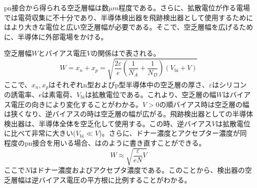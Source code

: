 pn接合から得られる空乏層幅は数$\si{\micro m}$程度である。さらに、拡散電位が作る電場では電荷収集に不十分であり、半導体検出器を飛跡検出器として使用するためにはより大きな電位と広い空乏層幅が必要である。そこで、空乏層幅を広げるために、半導体に外部電場をかける。

空乏層幅$W$とバイアス電圧$V$の関係はで表される。
\begin{equation}
  \label{eq:kuubousouhaba}
  W = x_n + x_p = \sqrt{\frac{2\varepsilon}{e}\left( \frac{1}{N_A} + \frac{1}{N_D} \right)(V_\mathrm{bi}+V) }
\end{equation}
ここで、$x_n, x_p$はそれぞれn型およびp型半導体中の空乏層の厚さ、$\varepsilon$はシリコンの誘電率、$e$は素電荷、$V_\mathrm{bi}$は拡散電位である。これより、空乏層の幅$W$はバイアス電圧の向きにより変化することがわかる。$V>0$の順バイアス時は空乏層の幅は狭くなり、逆バイアスの時は空乏層の幅が広がる。飛跡検出器としての半導体検出器は、半導体全体を空乏化して使用する。この時、逆バイアス$V$は拡散電位に比べて非常に大きい($V_\mathrm{bi}\ll V$)。さらに、ドナー濃度とアクセプター濃度が同程度のpn接合を用いる場合、はのように書き直すことができる。
\begin{equation}
  \label{eq:kennshutukikuubousou}
  W \approx \sqrt{\frac{\varepsilon }{eN}V}
\end{equation}
ここで$N$はドナー濃度およびアクセプタ濃度である。このことから、検出器の空乏層幅は逆バイアス電圧の平方根に比例することがわかる。

